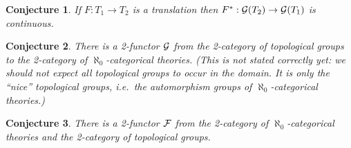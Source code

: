 \documentclass[12pt]{article}
\newtheorem*{conj}{Conjecture}
\theoremstyle{definition}
\begin{document}
\begin{conj} If $F:T_1\to T_2$ is a translation then
  $F^*:\mathcal G (T_2)\to \mathcal G (T_1)$ is continuous. \end{conj}

\begin{conj} There is a 2-functor $\mathcal G$ from the 2-category of
  topological groups to the 2-category of $\aleph _0$-categorical
  theories. (This is not stated correctly yet: we should not expect
  all topological groups to occur in the domain. It is only the
  ``nice'' topological groups, i.e.\ the automorphism groups of
  $\aleph _0$-categorical theories.) \end{conj}


\begin{conj} There is a 2-functor $\mathcal F$ from the 2-category of
  $\aleph _0$-categorical theories and the 2-category of topological
  groups. \end{conj}







\printbibliography 
\end{document}
